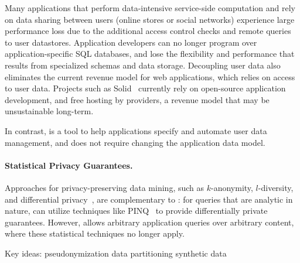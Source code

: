 Many applications that perform data-intensive service-side computation and rely on data sharing
between users (\eg online stores or social networks) experience large performance loss due to the
additional access control checks and remote queries to user datastores. Application
developers can no longer program over application-specific SQL databases, and lose the flexibility and performance that results from specialized schemas and data storage.
Decoupling user data also eliminates the current revenue model for web applications, which relies on access
to user data. Projects such as Solid~\cite{solid} currently rely on open-source application
development, and free hosting by providers, a revenue model that may be unsustainable
long-term.

In contrast, \sys is a tool to help applications specify and automate user data management, and
does not require changing the application data model.



\paragraph{Statistical Privacy Guarantees.}
Approaches for privacy-preserving data mining, such as $k$-anonymity, $l$-diversity, and
differential privacy~\cite{dataminingmodels}, are complementary to \sys: for queries that are
analytic in nature, \name can utilize techniques like PINQ~\cite{pinq} to provide differentially
private guarantees. However, \sys allows arbitrary application queries over arbitrary content, where
these statistical techniques no longer apply. 

\iffalse
Key ideas:
    pseudonymization 
    data partitioning
    synthetic data

